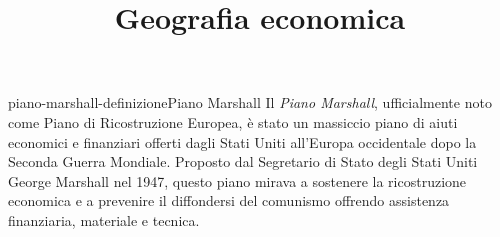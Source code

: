\documentclass[preview]{standalone}
\begin{document}
\title{Geografia economica}
\genpage

\begin{snippetdefinition}{piano-marshall-definizione}{Piano Marshall}
    Il \textit{Piano Marshall}, ufficialmente noto come Piano di Ricostruzione Europea,
    è stato un massiccio piano di aiuti economici e finanziari offerti dagli Stati Uniti
    all'Europa occidentale dopo la Seconda Guerra Mondiale.
    Proposto dal Segretario di Stato degli Stati Uniti George Marshall nel 1947,
    questo piano mirava a sostenere la ricostruzione economica e a prevenire
    il diffondersi del comunismo offrendo assistenza finanziaria, materiale e tecnica.
\end{snippetdefinition}
\end{document}
